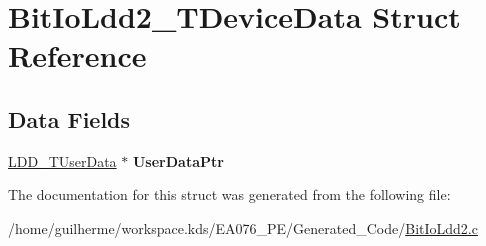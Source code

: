\hypertarget{struct_bit_io_ldd2___t_device_data}{}\section{Bit\+Io\+Ldd2\+\_\+\+T\+Device\+Data Struct Reference}
\label{struct_bit_io_ldd2___t_device_data}
\subsection*{Data Fields}
\begin{DoxyCompactItemize}
\item 
\mbox{\label{struct_bit_io_ldd2___t_device_data_adce7b8d72c3e208db6a56b0bb10898ac}} 
\hyperlink{group___p_e___types__module_ga0b66a73f87238a782318aa0be7578e35}{L\+D\+D\+\_\+\+T\+User\+Data} $\ast$ {\bfseries User\+Data\+Ptr}
\end{DoxyCompactItemize}


The documentation for this struct was generated from the following file\+:\begin{DoxyCompactItemize}
\item 
/home/guilherme/workspace.\+kds/\+E\+A076\+\_\+\+P\+E/\+Generated\+\_\+\+Code/\hyperlink{_bit_io_ldd2_8c}{Bit\+Io\+Ldd2.\+c}\end{DoxyCompactItemize}
